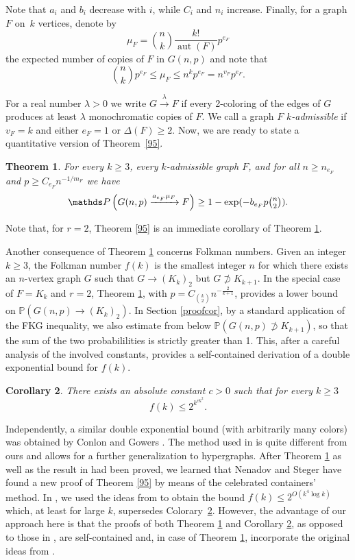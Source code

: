 \documentclass[reqno, 12pt]{amsart}
\newcommand{\PP}{\mathds{P}}
\newtheorem{theorem}{Theorem}
\newtheorem{cor}[theorem]{Corollary}
\def\PP{\mathds P}
\DeclareMathOperator{\aut}{aut}
\begin{document}
Note that $a_i$ and $b_i$ decrease with $i$, while $C_i$ and $n_i$ increase.
Finally, for a graph $F$ on~$k$ vertices, denote by
$$
\mu_F=\binom nk\frac{k!}{\aut(F)}p^{e_F}$$
the expected number of  copies of $F$ in $G(n,p)$
and note that
 \begin{equation}\label{miu}
 \binom nk p^{e_F}\le\mu_F\le n^{k} p^{e_F}=n^{v_F} p^{e_F}.
 \end{equation}



For  a real number $\lambda>0$ we write $G\xrightarrow{\lambda}F$ if every 2-coloring of the edges of $G$ produces at least $\lambda$ monochromatic copies of $F$. We call a graph $F$ \emph{$k$-admissible} if $v_F=k$ and either $e_F=1$ or $\Delta(F)\ge2$.
Now, we are ready to state a quantitative version of Theorem~\ref{95}.

\begin{theorem}\label{rg}
For every $k\ge3$, every $k$-admissible graph $F$, and for all
$n\ge n_{e_F}$ and $p\geq C_{e_F}n^{-1/m_F}$ we have
$$\PP\left(G(n,p)\xrightarrow{a_{e_F}\mu_F}F\right)\ge 1-\exp(-b_{e_F}p\tbinom n2).$$
\end{theorem}
\noindent
Note that,  for $r=2$, Theorem \ref{95} is an immediate
corollary of Theorem \ref{rg}.


Another consequence of Theorem \ref{rg} concerns    Folkman numbers.  Given an integer $k\ge3$, the Folkman number $f(k)$ is the smallest integer $n$ for which there exists an $n$-vertex graph $G$ such that $G\to (K_k)_2$ but $G\not\supset K_{k+1}$.
In the special case of $F=K_k$ and $r=2$, Theorem \ref{rg}, with  $p=C_{\binom k2}n^{-\tfrac2{k+1}}$,
provides a lower bound on  $\PP(G(n,p)\rightarrow (K_k)_2)$. In Section \ref{proofcor}, by a standard application of the FKG inequality, we also estimate from below
$\PP(G(n,p)\not\supset K_{k+1})$, so that the sum of the two probabililities is  strictly greater than 1.  This, after a careful analysis of the involved constants, provides a self-contained
derivation  of a double exponential bound for $f(k)$.

\begin{cor}\label{main}
There exists an absolute constant $c>0$ such that for every $k\ge 3$
$$f(k)\le 2^{k^{ck^2}}.$$
\end{cor}

\noindent  Independently,
a similar double exponential bound  (with arbitrarily many colors) was obtained by Conlon and
Gowers \cite{CG}. The method used in \cite{CG} is quite different from ours and allows for  a further generalization to hypergraphs. 
After  Theorem \ref{rg} as well as the result  in \cite{CG} had been proved, we learned that
 Nenadov and Steger \cite{Steger}  have found a new  proof of Theorem \ref{95} by means of the celebrated containers' method. In \cite{folk}, we used the ideas from \cite{Steger} to obtain the bound $f(k)\le 2^{O(k^4\log k)}$ which, at least for large $k$,
supersedes Colorary~\ref{main}. However, the advantage of  our approach here is that the proofs of both Theorem \ref{rg} and Corollary  \ref{main}, as opposed to those in \cite{folk},
are self-contained and, in case of Theorem \ref{rg}, incorporate the original ideas from \cite{rr}.
\end{document}
